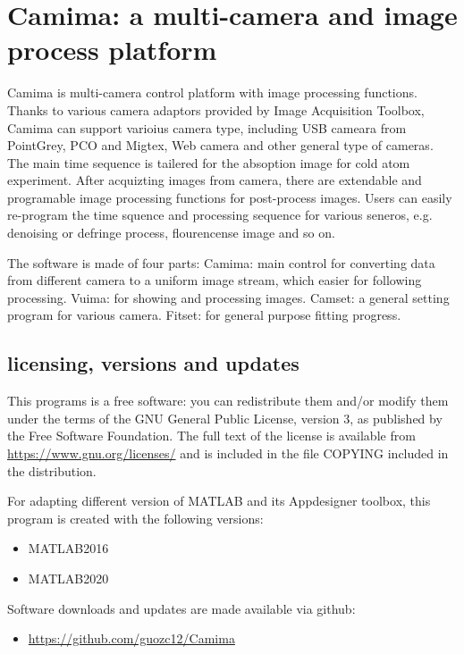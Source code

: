 \chapter{Camima: a multi-camera and image process platform}
\label{chap:camima}

Camima is multi-camera control platform with image processing functions. Thanks to various camera adaptors provided by Image Acquisition Toolbox, Camima can support varioius camera type, including USB cameara from PointGrey, PCO and Migtex, Web camera and other general type of cameras. The main time sequence is tailered for the absoption image for cold atom experiment. After acquizting images from camera, there are extendable and programable image processing functions for post-process images. Users can easily re-program the time squence and processing sequence for various seneros, e.g. denoising or defringe process, flourencense image and so on.

The software is made of four parts: Camima: main control for converting data from different camera to a uniform image stream, which easier for following processing. Vuima: for showing and processing images. Camset: a general setting program for various camera. Fitset: for general purpose fitting progress.

\section{licensing, versions and updates}
This programs is a free software: you can redistribute them and/or modify them under the terms of the GNU General Public License, version 3, as published by the Free Software Foundation. The full text of the license is available from \href{https://www.gnu.org/licenses/}{https://www.gnu.org/licenses/} and is included in the file COPYING included in the distribution.

For adapting different version of MATLAB and its Appdesigner toolbox, this program is created with the following versions:
\begin{itemize}
\item MATLAB2016
\item MATLAB2020
\end{itemize}

Software downloads and updates are made available via github:
\begin{itemize}
\item \href{https://github.com/guozc12/Camima}{https://github.com/guozc12/Camima}
\end{itemize}

